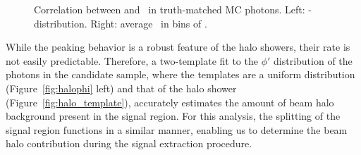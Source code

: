\begin{figure}[htbp]
  \centering
  \caption{
    Correlation between \sieie and \emip\ in truth-matched MC photons. 
    Left: \emip-\sieie distribution.
    Right: average \emip\ in bins of \sieie.
  }
  \label{fig:sieie_mip_corr}
\end{figure}

While the peaking behavior is a robust feature of the halo showers, their rate is not easily predictable. 
Therefore,  a two-template fit to the $\phi'$ distribution of the photons in the candidate sample, where the templates are a uniform distribution (Figure~\ref{fig:halophi} left) and that of the halo shower (Figure~\ref{fig:halo_template}), accurately estimates the amount of beam halo background present in the signal region. 
For this analysis, the splitting of the signal region functions in a similar manner, enabling us to determine the beam halo contribution during the signal extraction procedure.

